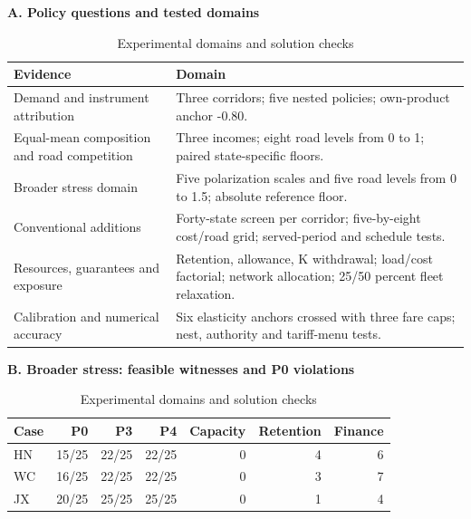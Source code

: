 \begin{table}[htbp]\centering
\caption{Experimental domains and solution checks}\label{tab:experiment_overview}
\begin{minipage}{.95\textwidth}\fontsize{8}{9.5}\selectfont{}\setlength{\tabcolsep}{2pt}\renewcommand{\arraystretch}{1.02}
\par\noindent\textbf{A. Policy questions and tested domains}\par\smallskip
\begin{tabular*}{\linewidth}{@{\extracolsep{\fill}}>{\raggedright\arraybackslash}p{.29\linewidth}>{\raggedright\arraybackslash}p{.65\linewidth}@{}}\toprule
Evidence & Domain \\
\midrule
Demand and instrument attribution & Three corridors; five nested policies; own-product anchor -0.80. \\
Equal-mean composition and road competition & Three incomes; eight road levels from 0 to 1; paired state-specific floors. \\
Broader stress domain & Five polarization scales and five road levels from 0 to 1.5; absolute reference floor. \\
Conventional additions & Forty-state screen per corridor; five-by-eight cost/road grid; served-period and schedule tests. \\
Resources, guarantees and exposure & Retention, allowance, K withdrawal; load/cost factorial; network allocation; 25/50 percent fleet relaxation. \\
Calibration and numerical accuracy & Six elasticity anchors crossed with three fare caps; nest, authority and tariff-menu tests. \\
\bottomrule\end{tabular*}\par\medskip
\par\noindent\textbf{B. Broader stress: feasible witnesses and P0 violations}\par\smallskip
\begin{tabular*}{\linewidth}{@{\extracolsep{\fill}}lrrrrrr@{}}\toprule
Case & P0 & P3 & P4 & Capacity & Retention & Finance \\
\midrule
HN & 15/25 & 22/25 & 22/25 & 0 & 4 & 6 \\
WC & 16/25 & 22/25 & 22/25 & 0 & 3 & 7 \\
JX & 20/25 & 25/25 & 25/25 & 0 & 1 & 4 \\
\bottomrule\end{tabular*}\par\medskip

\end{minipage}
\end{table}

